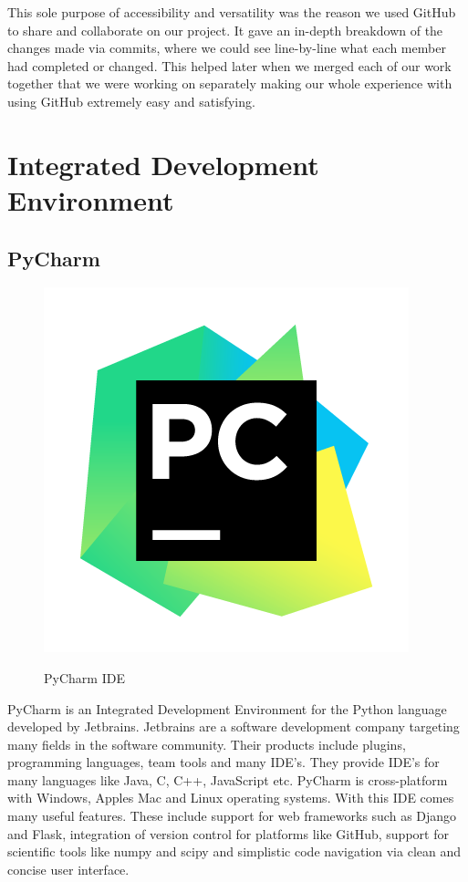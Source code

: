 This sole purpose of accessibility and versatility was the reason we used GitHub to share and collaborate on our project. It gave an in-depth breakdown of the changes made via commits, where we could see line-by-line what each member had completed or changed. This helped later when we merged each of our work together that we were working on separately making our whole experience with using GitHub extremely easy and satisfying.

\section{Integrated Development Environment}
\subsection{PyCharm}

\begin{figure}
\includegraphics[scale=0.25]{img/PyCharm.png}
\caption{PyCharm IDE }
\cite{ide}
\end{figure}
PyCharm\cite{ide} is an Integrated Development Environment for the Python language developed by Jetbrains\cite{jetbrains}. Jetbrains are a software development company targeting many fields in the software community. Their products include plugins, programming languages, team tools and many IDE's. They provide IDE's for many languages like Java, C, C++, JavaScript etc. PyCharm is cross-platform with Windows, Apples Mac and Linux operating systems. With this IDE comes many useful features. These include support for web frameworks such as Django and Flask\cite{pycharm}, integration of version control for platforms like GitHub, support for scientific tools like numpy and scipy and simplistic code navigation via clean and concise user interface.

